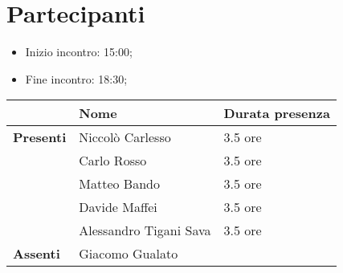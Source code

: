 \section{Partecipanti}

\begin{itemize}
    \item Inizio incontro: 15:00;
    \item Fine incontro: 18:30;
\end{itemize}


\begin{center}
{\renewcommand{\arraystretch}{1.5}
\begin{tabular}{lll}
	                    & \textbf{Nome}  			& \textbf{Durata presenza} \\
	\hline
	\textbf{Presenti}   & Niccolò Carlesso          & 3.5 ore					\\
						& Carlo Rosso 				& 3.5 ore 					\\
						& Matteo Bando 				& 3.5 ore 					\\
						& Davide Maffei 			& 3.5 ore 					\\
						& Alessandro Tigani Sava 	& 3.5 ore 					\\ 
	\hline
	\textbf{Assenti}	& Giacomo Gualato           &      						\\
\end{tabular}	
}
\end{center}
